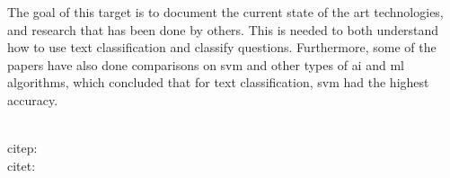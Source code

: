 \label{chap:chapter2}
The goal of this target is to document the current state of the art technologies, and research 
that has been done by others. This is needed to both understand how to use text classification and 
classify questions. Furthermore, some of the papers have also done comparisons on \gls{svm} and 
other types of \gls{ai} and \gls{ml} algorithms, which concluded that for text classification, 
\gls{svm} had the highest accuracy.

\begin{comment}
For Harvard style referencing, you use the \texttt{citep} and \texttt{citet} style of citation. 
These give parentheses around the citation or the name of the author as text with the year in parentheses.  
If you want the citation to be read in a sentence then you use  \texttt{citet}. 
If you want it to be just parenthetical to the sentence at the end, then use \texttt{citep}.


\end{comment}
~\\
citep: \citep{ChangLin2011} \\
citet: \citet{ChangLin2011} \\

